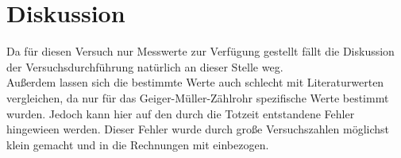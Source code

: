 \section{Diskussion}
Da für diesen Versuch nur Messwerte zur Verfügung gestellt fällt die Diskussion der Versuchsdurchführung natürlich an dieser Stelle weg.\\
Außerdem lassen sich die bestimmte Werte auch schlecht mit Literaturwerten vergleichen, da nur für das Geiger-Müller-Zählrohr spezifische Werte bestimmt wurden.
Jedoch kann hier auf den durch die Totzeit entstandene Fehler hingewieen werden. 
Dieser Fehler wurde durch große Versuchszahlen möglichst klein gemacht und in die Rechnungen mit einbezogen.